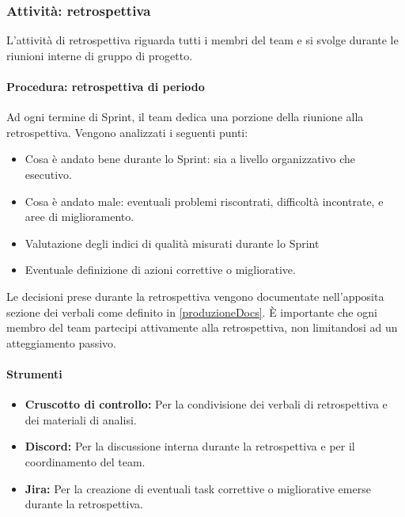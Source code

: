 \documentclass[a4paper,12pt]{article}
\begin{document}
\subsubsection{Attività: retrospettiva}
L'attività di retrospettiva riguarda tutti i membri del team e si svolge
durante le riunioni interne di gruppo di progetto.
\paragraph{Procedura: retrospettiva di periodo}
Ad ogni termine di Sprint, il team dedica una porzione della riunione alla
retrospettiva. Vengono analizzati i seguenti punti:
\begin{itemize}
    \item Cosa è andato bene durante lo Sprint: sia a livello organizzativo che
          esecutivo.
    \item Cosa è andato male: eventuali problemi riscontrati, difficoltà incontrate,
          e aree di miglioramento.
    \item Valutazione degli indici di qualità misurati durante lo Sprint
    \item Eventuale definizione di azioni correttive o migliorative.
\end{itemize}
Le decisioni prese durante la retrospettiva vengono documentate nell'apposita sezione dei verbali come definito in \ref{produzioneDocs}. È importante
che ogni membro del team partecipi attivamente alla retrospettiva, non limitandosi ad un atteggiamento passivo.

\paragraph{Strumenti}
\begin{itemize}
    \item \textbf{Cruscotto di controllo:} Per la condivisione dei verbali di retrospettiva e dei materiali di analisi.
    \item \textbf{Discord:} Per la discussione interna durante la retrospettiva e per il coordinamento del team.
    \item \textbf{Jira:} Per la creazione di eventuali task correttive o migliorative emerse durante la retrospettiva.
\end{itemize}
\end{document}
